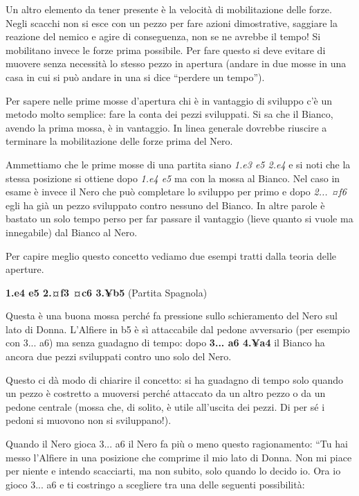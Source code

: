 Un altro elemento da tener presente è la velocità di mobilitazione delle
forze. Negli scacchi non si esce con un pezzo per fare azioni
dimostrative, saggiare la reazione del nemico e agire di conseguenza,
non se ne avrebbe il tempo! Si mobilitano invece le forze prima
possibile. Per fare questo si deve evitare di muovere senza necessità lo
stesso pezzo in apertura (andare in due mosse in una casa in cui si può
andare in una si dice ``perdere un tempo'').

Per sapere nelle prime mosse d'apertura chi è in vantaggio di sviluppo
c'è un metodo molto semplice: fare la conta dei pezzi sviluppati. Si sa
che il Bianco, avendo la prima mossa, è in vantaggio. In linea generale
dovrebbe riuscire a terminare la mobilitazione delle forze prima del
Nero.

Ammettiamo che le prime mosse di una partita siano \emph{1.e3 e5 2.e4} e
si noti che la stessa posizione si ottiene dopo \emph{1.e4 e5} ma con la
mossa al Bianco. Nel caso in esame è invece il Nero che può completare
lo sviluppo per primo e dopo \emph{2... ¤f6} egli ha già un pezzo
sviluppato contro nessuno del Bianco. In altre parole è bastato un solo
tempo perso per far passare il vantaggio (lieve quanto si vuole ma
innegabile) dal Bianco al Nero.

Per capire meglio questo concetto vediamo due esempi tratti dalla teoria
delle aperture.

\textbf{1.e4 e5 2.¤f3 ¤c6 3.¥b5} (Partita Spagnola)


Questa è una buona mossa perché fa pressione sullo schieramento del Nero
sul lato di Donna. L'Alfiere in b5 è sì attaccabile dal pedone
avversario (per esempio con 3... a6) ma senza guadagno di tempo: dopo
\textbf{3... a6 4.¥a4} il Bianco ha ancora due pezzi sviluppati contro
uno solo del Nero.

Questo ci dà modo di chiarire il concetto: si ha guadagno di tempo solo
quando un pezzo è costretto a muoversi perché attaccato da un altro
pezzo o da un pedone centrale (mossa che, di solito, è utile all'uscita
dei pezzi.
Di per sé i pedoni si muovono non si sviluppano!).

Quando il Nero gioca 3... a6 il Nero fa più o meno questo ragionamento:
``Tu hai messo l'Alfiere in una posizione che comprime il mio lato di
Donna. Non mi piace per niente e intendo scacciarti, ma non subito, solo
quando lo decido io. Ora io gioco 3... a6 e ti costringo a scegliere tra
una delle seguenti possibilità:

